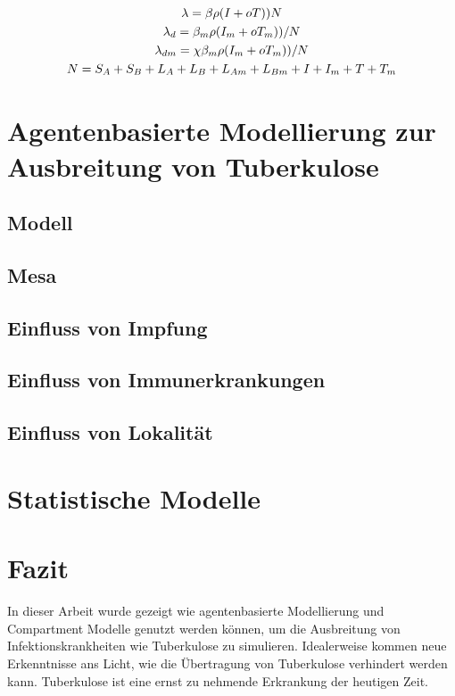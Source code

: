 \documentclass[paper=a4, fontsize=11pt, ngerman, abstract=on]{scrartcl}
\numberwithin{equation}{section} %
\numberwithin{figure}{section} %
\numberwithin{table}{section} %
\begin{document}
\begin{gather*}
  \lambda = \beta \rho (I + oT)) \/ N \\
  \lambda _{d} = \beta_{m} \rho (I_{m} + oT_{m})) / N \\
  \lambda _{dm} = \chi\beta_{m} \rho (I_{m} + oT_{m})) / N \\
  N = S_{A} + S_{B} + L_{A} + L_{B} + L_{Am} + L_{Bm} + I + I_{m} + T + T_{m}
\end{gather*}

\section{Agentenbasierte Modellierung zur Ausbreitung von Tuberkulose}

\blindtext

\subsection{Modell}

\blindtext

\subsection{Mesa}

\blindtext

\subsection{Einfluss von Impfung}

\blindtext

\subsection{Einfluss von Immunerkrankungen}

\blindtext

\subsection{Einfluss von Lokalität}

\blindtext

\section{Statistische Modelle}

\blindtext

\section{Fazit}

In dieser Arbeit wurde gezeigt wie agentenbasierte Modellierung und Compartment Modelle genutzt werden können, um die Ausbreitung von Infektionskrankheiten wie Tuberkulose zu simulieren. Idealerweise kommen neue Erkenntnisse ans Licht, wie die Übertragung von Tuberkulose verhindert werden kann. Tuberkulose ist eine ernst zu nehmende Erkrankung der heutigen Zeit.

\newpage



\end{document}
